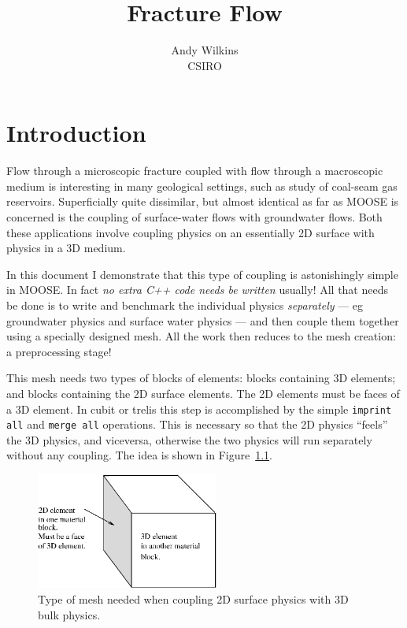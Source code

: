 \documentclass[]{scrreprt}
\begin{document}
\title{Fracture Flow}
\author{Andy Wilkins \\
CSIRO}
\maketitle

\tableofcontents

\chapter{Introduction}

Flow through a microscopic fracture coupled with flow through a
macroscopic medium is interesting in many geological settings, such as
study of coal-seam gas reservoirs.  Superficially quite dissimilar,
but almost identical as far as MOOSE is concerned is the coupling of
surface-water flows with groundwater flows.  Both these applications involve
coupling physics on an essentially 2D surface with physics in a 3D
medium.

In this document I demonstrate that this type of coupling is
astonishingly simple in MOOSE.  In fact {\em no extra C++ code needs
  be written} usually!  All that needs be done is to write and
benchmark the individual physics {\em separately} --- eg groundwater
physics and surface water physics --- and then couple them together
using a specially designed mesh.  All the work then reduces to the
mesh creation: a preprocessing stage!

This mesh needs two types of blocks of elements: blocks containing 3D
elements; and blocks containing the 2D surface elements.  The 2D
elements must be faces of a 3D element.   In cubit or trelis this step
is accomplished by the simple {\tt imprint all} and {\tt merge all}
operations.  This is necessary so that the 2D physics ``feels'' the 3D
physics, and viceversa, otherwise the two physics will run separately
without any coupling.  The idea is shown in Figure~\ref{bdy_bulk.fig}.

\begin{figure}[htb]
\centering
\includegraphics[width=6cm]{bdy_bulk.eps}
\caption{Type of mesh needed when coupling 2D surface physics with 3D
  bulk physics.}
\label{bdy_bulk.fig}
\end{figure}
\end{document}
